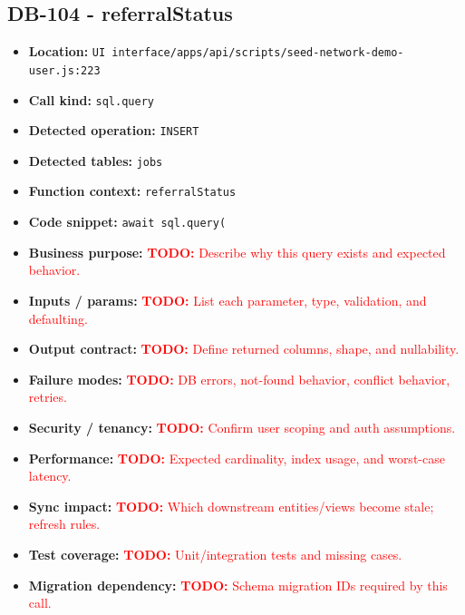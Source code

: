 \documentclass[11pt]{article}
\newcommand{\todoitem}[1]{\textcolor{red}{\textbf{TODO:} #1}}
\begin{document}
\subsection{DB-104 - referralStatus}
\begin{itemize}[leftmargin=1.5em]
\item \textbf{Location:} \texttt{UI interface/apps/api/scripts/seed-network-demo-user.js:223}
\item \textbf{Call kind:} \texttt{sql.query}
\item \textbf{Detected operation:} \texttt{INSERT}
\item \textbf{Detected tables:} \texttt{jobs}
\item \textbf{Function context:} \texttt{referralStatus}
\item \textbf{Code snippet:} \texttt{await sql.query(}
\item \textbf{Business purpose:} \todoitem{Describe why this query exists and expected behavior.}
\item \textbf{Inputs / params:} \todoitem{List each parameter, type, validation, and defaulting.}
\item \textbf{Output contract:} \todoitem{Define returned columns, shape, and nullability.}
\item \textbf{Failure modes:} \todoitem{DB errors, not-found behavior, conflict behavior, retries.}
\item \textbf{Security / tenancy:} \todoitem{Confirm user scoping and auth assumptions.}
\item \textbf{Performance:} \todoitem{Expected cardinality, index usage, and worst-case latency.}
\item \textbf{Sync impact:} \todoitem{Which downstream entities/views become stale; refresh rules.}
\item \textbf{Test coverage:} \todoitem{Unit/integration tests and missing cases.}
\item \textbf{Migration dependency:} \todoitem{Schema migration IDs required by this call.}
\end{itemize}
\end{document}
